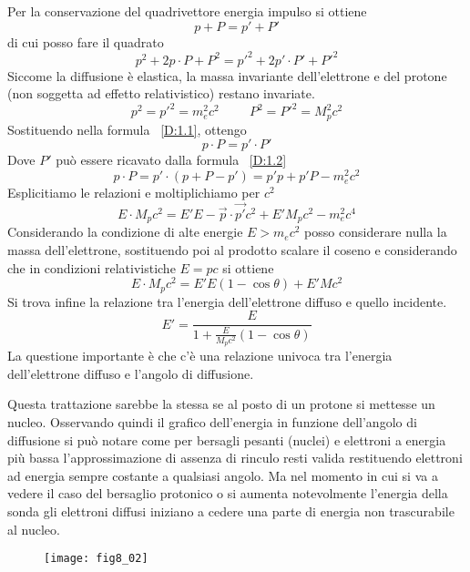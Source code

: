 Per la conservazione del quadrivettore energia impulso si ottiene
\begin{equation}
p+P =p'+P'
\label{D:1.2}
\end{equation}
di cui posso fare il quadrato
\begin{equation}
p^2+2p\cdot P+P^2 =p'^2+2p'\cdot P'+P'^2
\label{D:1.1}
\end{equation}
Siccome la diffusione è elastica, la massa invariante dell'elettrone e del protone (non soggetta ad effetto relativistico) restano invariate.
\begin{equation}
p^2=p'^2=m_e^2c^2\hspace{1cm}P^2=P'^2=M_p^2c^2
\end{equation}
Sostituendo nella formula ~\eqref{D:1.1}, ottengo 
\begin{equation}
p\cdot P=p'\cdot P'
\end{equation}
Dove $P'$ può essere ricavato dalla formula ~\eqref{D:1.2}
\begin{equation}
p\cdot P =p'\cdot (p+P-p')=p'p+p'P-m_e^2c^2
\end{equation}
Esplicitiamo le relazioni e moltiplichiamo per $c^2$
\begin{equation}
E\cdot M_pc^2=E'E-\vec{p}\cdot \vec{p'}c^2+E'M_pc^2-m_e^2c^4
\end{equation}
Considerando la condizione di alte energie $E>m_ec^2$ posso considerare nulla la massa dell'elettrone, sostituendo poi al prodotto scalare il coseno e considerando che in condizioni relativistiche $E=pc$ si ottiene
\begin{equation}
E\cdot M_pc^2=E'E(1-\cos\theta)+E'Mc^2
\end{equation}
Si trova infine la relazione tra l'energia dell'elettrone diffuso e quello incidente.
\begin{equation}
E'=\frac{E}{1+\frac{E}{M_pc^2}(1-\cos\theta)}
\end{equation}
La questione importante è che c'è una relazione univoca tra l'energia dell'elettrone diffuso e l'angolo di diffusione.

Questa trattazione sarebbe la stessa se al posto di un protone si mettesse un nucleo.
Osservando quindi il grafico dell'energia in funzione dell'angolo di diffusione si può notare come per bersagli pesanti (nuclei) e elettroni a energia più bassa l'approssimazione di assenza di rinculo resti valida restituendo elettroni ad energia sempre costante a qualsiasi angolo.
Ma nel momento in cui si va a vedere il caso del bersaglio protonico o si aumenta notevolmente l'energia della sonda gli elettroni diffusi iniziano a cedere una parte di energia non trascurabile al nucleo.
\begin{figure}[h]
\centering
\texttt{[image: fig8\_02]}
\end{figure}

